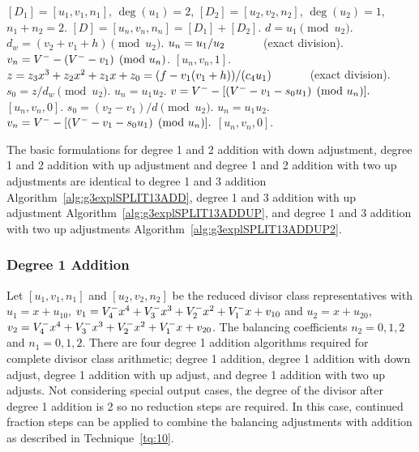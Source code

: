 \begin{algorithm}[H]
\caption{Genus 3 Split Model Degree 1 and 2 Addition\label{alg:g3explSPLIT12ADD}}
\begin{algorithmic} [1]
\Require $[D_1] = [u_1,v_1,n_1]$, $\deg(u_1) = 2$, $[D_2] = [u_2,v_2,n_2]$, $\deg(u_2) = 1$, $n_1 + n_2 = 2$.
\Ensure $[D] = [u_n,v_n,n_n] = [D_1] + [D_2] $.
\algrule
\vspace{-2pt}
\State $d = u_1 \pmod{u_2}$.
    \State $d_w = (v_2 + v_1 + h) \pmod{u_2}$.
        \State $u_n = u_1/u_2 \quad\quad\quad$ (exact division).
        \State $v_n = V^{-} - (V^{-} - v_1) \pmod{u_n}$.
        \State \Return $[u_n,v_n,1]$.
    \EndIf
    \State $z = z_3x^3 + z_2x^2 + z_1x + z_0 = (f - v_1(v_1 + h))/(c_4u_1) \quad\quad\quad$ (exact division).  
    \State $s_0 = z/d_w \pmod{u_2}$.
    \State $u_n = u_1u_2$.
    \State $v = V^{-} - [(V^{-} - v_1 - s_0u_1) \pmod{u_n}].$ 
    \State \Return $[u_n,v_n,0]$.
\EndIf
\State $s_0 = (v_2 - v_1)/d \pmod{u_2}$.
\State $u_n = u_1u_2$.
\State $v_n = V^{-} - [(V^{-} - v_1 - s_0u_1) \pmod{u_n}].$ 
\State \Return $[u_n,v_n,0]$.
\vspace{-2pt}
\end{algorithmic}
\end{algorithm}

The basic formulations for degree 1 and 2 addition with down adjustment, degree
1 and 2 addition with up adjustment and degree 1 and 2 addition with two up
adjustments are identical to degree 1 and 3 addition
Algorithm~\ref{alg:g3explSPLIT13ADD}, degree 1 and 3 addition with up adjustment
Algorithm~\ref{alg:g3explSPLIT13ADDUP}, and degree 1 and 3 addition with two up
adjustments Algorithm~\ref{alg:g3explSPLIT13ADDUP2}.


\subsubsection{Degree 1 Addition}
Let $[u_1,v_1,n_1]$ and $[u_2,v_2,n_2]$ be the reduced divisor class representatives
with $u_1 = x + u_{10}$, $v_1 = V^{-}_4x^4 + V^{-}_3x^3 + V^{-}_2x^2 + V^{-}_1x +
v_{10}$ and $u_2 = x + u_{20}$, $v_2 = V^{-}_4x^4 + V^{-}_3x^3 + V^{-}_2x^2 + V^{-}_1x +
v_{20}$. The balancing coefficients $n_2 = 0,1,2$ and $n_1 = 0,1,2$. There are
four degree 1 addition algorithms required for complete divisor class
arithmetic; degree 1 addition, degree 1 addition with down adjust, degree 1
addition with up adjust, and degree 1 addition with two up adjusts. Not
considering special output cases, the degree of the divisor after degree 1
addition is 2 so no reduction steps are required. In this case, continued
fraction steps can be applied to combine the balancing adjustments with addition
as described in Technique~\ref{tq:10}.

